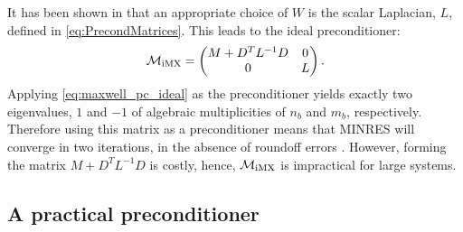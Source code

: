 


It has been shown in \cite{greif2007preconditioners} that an appropriate choice of $W$ is the scalar Laplacian, $L$, defined in \eqref{eq:PrecondMatrices}. This leads to the ideal preconditioner:
\begin{equation}
\label{eq:maxwell_pc_ideal}
\mathcal{M}_{\rm iMX} =
\begin{pmatrix}
M+D^T L^{-1} D & 0 \\
0 & L
\end{pmatrix}.
\end{equation}
Applying \eqref{eq:maxwell_pc_ideal} as the preconditioner yields exactly two eigenvalues, $1$ and $-1$ of algebraic multiplicities of $n_b$ and $m_b$, respectively. Therefore using this matrix as a preconditioner means that MINRES will converge in two iterations, in the absence of roundoff errors  \cite{paige1975solution}. However, forming the matrix $M+D^T L^{-1} D$ is costly, hence, $\mathcal{M}_{\rm iMX}$  is  impractical  for large systems.


\subsection{A practical preconditioner}

